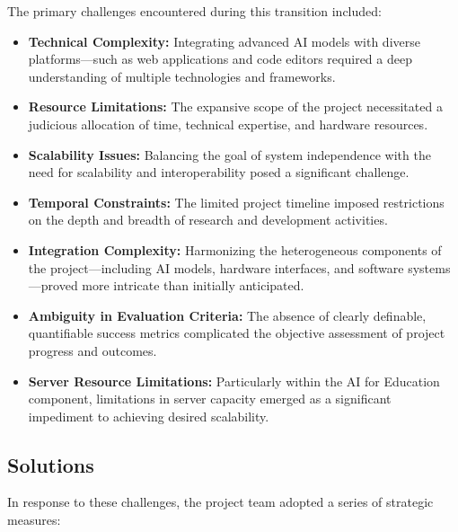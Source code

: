 The primary challenges encountered during this transition included:

\begin{itemize}
    \item \textbf{Technical Complexity:} Integrating advanced AI models with diverse platforms—such as web applications and code editors required a deep understanding of multiple technologies and frameworks.
    \item \textbf{Resource Limitations:} The expansive scope of the project necessitated a judicious allocation of time, technical expertise, and hardware resources.
    \item \textbf{Scalability Issues:} Balancing the goal of system independence with the need for scalability and interoperability posed a significant challenge.
    \item \textbf{Temporal Constraints:} The limited project timeline imposed restrictions on the depth and breadth of research and development activities.
    \item \textbf{Integration Complexity:} Harmonizing the heterogeneous components of the project—including AI models, hardware interfaces, and software systems—proved more intricate than initially anticipated.
    \item \textbf{Ambiguity in Evaluation Criteria:} The absence of clearly definable, quantifiable success metrics complicated the objective assessment of project progress and outcomes.
    \item \textbf{Server Resource Limitations:} Particularly within the AI for Education component, limitations in server capacity emerged as a significant impediment to achieving desired scalability.
\end{itemize}

\subsection{Solutions}

In response to these challenges, the project team adopted a series of strategic measures:

